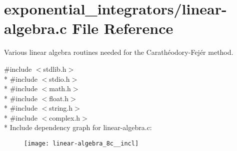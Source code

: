 \hypertarget{linear-algebra_8c}{}\section{exponential\+\_\+integrators/linear-\/algebra.c File Reference}
\label{linear-algebra_8c}


Various linear algebra routines needed for the Carathéodory-\/\+Fejér method.  


{\ttfamily \#include $<$stdlib.\+h$>$}\\*
{\ttfamily \#include $<$stdio.\+h$>$}\\*
{\ttfamily \#include $<$math.\+h$>$}\\*
{\ttfamily \#include $<$float.\+h$>$}\\*
{\ttfamily \#include $<$string.\+h$>$}\\*
{\ttfamily \#include $<$complex.\+h$>$}\\*
Include dependency graph for linear-\/algebra.c\+:\nopagebreak
\begin{figure}[H]
\begin{center}
\leavevmode
\texttt{[image: linear-algebra\_8c\_\_incl]}
\end{center}
\end{figure}
